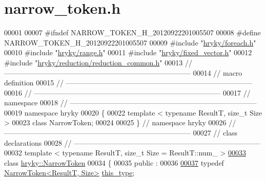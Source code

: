 \hypertarget{narrow__token_8h_source}{\section{narrow\-\_\-token.\-h}
}

\begin{DoxyCode}
00001 
00007 \textcolor{preprocessor}{#ifndef NARROW\_TOKEN\_H\_20120922201005507}
00008 \textcolor{preprocessor}{}\textcolor{preprocessor}{#define NARROW\_TOKEN\_H\_20120922201005507}
00009 \textcolor{preprocessor}{}\textcolor{preprocessor}{#include "\hyperlink{foreach_8h}{hryky/foreach.h}"}
00010 \textcolor{preprocessor}{#include "\hyperlink{range_8h}{hryky/range.h}"}
00011 \textcolor{preprocessor}{#include "\hyperlink{fixed__vector_8h}{hryky/fixed_vector.h}"}
00012 \textcolor{preprocessor}{#include "\hyperlink{reduction__common_8h}{hryky/reduction/reduction_common.h}"}
00013 \textcolor{comment}{//
      ------------------------------------------------------------------------------}
00014 \textcolor{comment}{// macro definition}
00015 \textcolor{comment}{//
      ------------------------------------------------------------------------------}
00016 \textcolor{comment}{//
      ------------------------------------------------------------------------------}
00017 \textcolor{comment}{// namespace}
00018 \textcolor{comment}{//
      ------------------------------------------------------------------------------}
00019 \textcolor{keyword}{namespace }hryky
00020 \{
00022     \textcolor{keyword}{template} < \textcolor{keyword}{typename} ResultT, \textcolor{keywordtype}{size\_t} Size >
00023     \textcolor{keyword}{class }NarrowToken;
00024 
00025 \} \textcolor{comment}{// namespace hryky}
00026 \textcolor{comment}{//
      ------------------------------------------------------------------------------}
00027 \textcolor{comment}{// class declarations}
00028 \textcolor{comment}{//
      ------------------------------------------------------------------------------}
00032 \textcolor{comment}{}\textcolor{keyword}{template} < \textcolor{keyword}{typename} ResultT, \textcolor{keywordtype}{size\_t} Size = ResultT::num\_ >
\hypertarget{narrow__token_8h_source_l00033}{}\hyperlink{classhryky_1_1_narrow_token}{00033} \textcolor{keyword}{class }\hyperlink{classhryky_1_1_narrow_token}{hryky::NarrowToken}
00034 \{
00035 \textcolor{keyword}{public} :
00036 
\hypertarget{narrow__token_8h_source_l00037}{}\hyperlink{classhryky_1_1_narrow_token_a8ef24a463e656c6201d12dc48d566c58}{00037}     \textcolor{keyword}{typedef} \hyperlink{classhryky_1_1_narrow_token}{NarrowToken<ResultT, Size>}  \hyperlink{classhryky_1_1_narrow_token_a8ef24a463e656c6201d12dc48d566c58}{this_type};

\end{DoxyCode}
